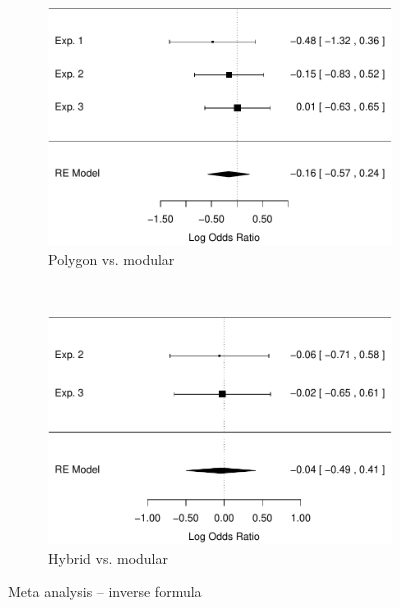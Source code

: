 \documentclass[man,10pt]{apa6}
\begin{document}
\begin{figure}
\centering
\begin{subfigure}[c]{0.4\textwidth}
\centering
\includegraphics[width=\textwidth]{figures/meta/question_typeinverse_formula_n_conditionpolygon.pdf}
\caption{Polygon vs. modular}
\end{subfigure}
~
\begin{subfigure}[c]{0.4\textwidth}
\centering
\includegraphics[width=\textwidth]{figures/meta/question_typeinverse_formula_n_conditionhybrid.pdf}
\caption{Hybrid vs. modular}
\end{subfigure}
\caption{Meta analysis -- inverse formula}
\label{meta_in_f}
\end{figure}\noindent 
\end{document}
